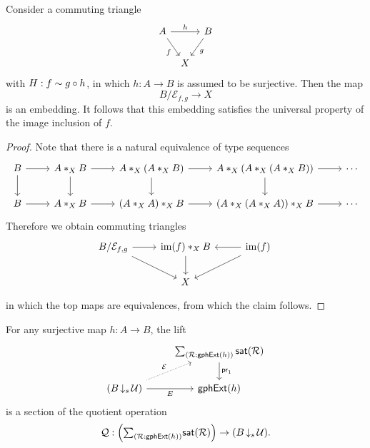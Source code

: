 \begin{prp}
Consider a commuting triangle
\begin{equation*}
\begin{tikzcd}[column sep=tiny]
A \arrow[rr,"h"] \arrow[dr,swap,"f"] & & B \arrow[dl,"g"] \\
& X
\end{tikzcd}
\end{equation*}
with $H:f\sim g\circ h$, in which $h:A\to B$ is assumed to be surjective. Then the map
\begin{equation*}
B/\mathcal{E}_{f,g} \to X
\end{equation*}
is an embedding. It follows that this embedding satisfies the universal property of the image inclusion of $f$. 
\end{prp}

\begin{proof}
Note that there is a natural equivalence of type sequences
\begin{equation*}
\begin{tikzcd}
B \arrow[d] \arrow[r] & \join[X]{A}{B} \arrow[d] \arrow[r] & \join[X]{A}{(\join[X]{A}{B})} \arrow[d] \arrow[r] & \join[X]{A}{(\join[X]{A}{(\join[X]{A}{B})})} \arrow[r] \arrow[d] & \cdots \\
B \arrow[r] & \join[X]{A}{B} \arrow[r] & \join[X]{(\join[X]{A}{A})}{B} \arrow[r] & \join[X]{(\join[X]{A}{(\join[X]{A}{A})})}{B} \arrow[r] & \cdots
\end{tikzcd}
\end{equation*}
Therefore we obtain commuting triangles
\begin{equation*}
\begin{tikzcd}
B/\mathcal{E}_{f,g} \arrow[r] \arrow[dr] & \join[X]{\im(f)}{B} \arrow[d] & \im(f) \arrow[dl] \arrow[l] \\
& X & \phantom{B/\mathcal{E}_{f,g}}
\end{tikzcd}
\end{equation*}
in which the top maps are equivalences, from which the claim follows.
\end{proof}

\begin{thm}
For any surjective map $h:A\to B$, the lift
\begin{equation*}
\begin{tikzcd}
& \sm{\mathcal{R}:\mathsf{gphExt}(h)}\mathsf{sat}(\mathcal{R}) \arrow[d,"\proj 1"] \\
(B\,{\downarrow_s}\,\UU) \arrow[r,swap,"E"] \arrow[ur,densely dotted,"\mathcal{E}"] & \mathsf{gphExt}(h)
\end{tikzcd}
\end{equation*}
is a section of the quotient operation
\begin{equation*}
\mathcal{Q} : \Big(\sm{\mathcal{R}:\mathsf{gphExt}(h)}\mathsf{sat}(\mathcal{R})\Big)\to (B\,{\downarrow_s}\,\UU).
\end{equation*}
\end{thm}

